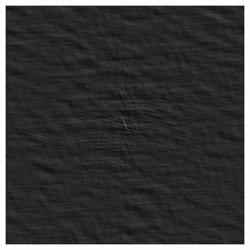 \documentclass[a4paper,12pt]{article}
\begin{document}
\begin{figure}
\begin{center}
                                                                                                                                                                          \includegraphics[width=0.8\textwidth]{rmap.pdf}

\end{center}
\end{figure}
\end{document}
